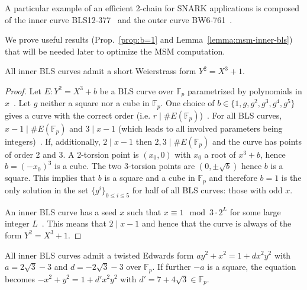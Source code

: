 \documentclass[journal=tches,spthm]{iacrtrans}
\newcommand{\F}{\ensuremath{\mathbb F}}
\begin{document}
A particular example of an efficient 2-chain for SNARK applications is composed
of the inner curve BLS12-377~\cite{SP:BCGMMW20} and the outer curve
BW6-761~\cite{CANS:HouGui20}.

We prove useful results (Prop.~\ref{prop:b=1} and
Lemma~\ref{lemma:msm-inner-bls}) that will be needed later to optimize the MSM
computation.
%
\begin{proposition}
\label{prop:b=1}
    All inner BLS curves admit a short Weierstrass form $Y^2=X^3+1$.
\end{proposition}

\begin{proof}
    Let $E:Y^2=X^3+b$ be a BLS curve over $\F_p$ parametrized by polynomials in
    $x$~\cite{SCN:BarLynSco02}. Let $g$ neither a square nor a cube in $\F_p$.
    One choice of $b \in \{1,g,g^2,g^3,g^4,g^5\}$ gives a curve with the
    correct order (i.e. $r \mid \#E(\F_p)$)~\cite[\S{}X.5]{Silverman09}. For
    all BLS curves, $x-1 \mid \#E(\F_p)$ and $3 \mid x-1$ (which leads to all
    involved parameters being integers)~\cite{SCN:BarLynSco02}. If,
    additionally, $2 \mid x-1$ then $2,3\mid \#E(\F_p)$ and the curve has
    points of order 2 and 3.  A 2-torsion point is $(x_0,0)$ with $x_0$ a root
    of $x^3 + b$, hence $b=(-x_0)^3$ is a cube.  The two 3-torsion points are
    $(0,\pm \sqrt{b})$ hence $b$ is a square.  This implies that $b$ is a
    square and a cube in $\F_p$ and therefore $b=1$ is the only solution in the
    set $\{g^i\}_{0\leq i \leq 5}$ for half of all BLS curves: those with odd
    $x$.

    An inner BLS curve has a seed $x$ such that $x \equiv 1 \mod 3\cdot 2^L$
    for some large integer $L$~\cite{EC:HouGui22}. This means that $2 \mid
    x-1$ and hence that the curve is always of the form $Y^2=X^3+1$.
\end{proof}

\begin{lemma}
    \label{lemma:msm-inner-bls}
    All inner BLS curves admit a twisted
    Edwards form $ay^2+x^2=1+dx^2y^2$ with $a=2\sqrt{3}-3$ and $d=-2\sqrt{3}-3$
    over $\F_p$. If further $-a$ is a square, the equation becomes
    $-x^2+y^2=1+d'x^2y^2$ with $d'=7+4\sqrt{3} \in \F_p$.
\end{lemma}
\end{document}
